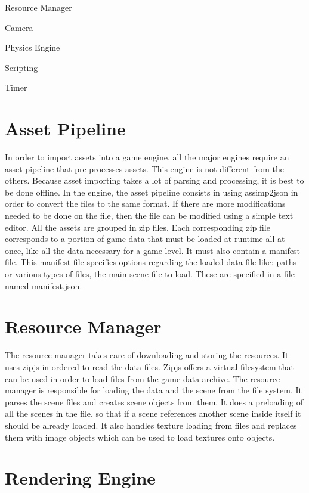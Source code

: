 \textbullet Resource Manager

\textbullet Camera

\textbullet Physics Engine

\textbullet Scripting

\textbullet Timer

\section{Asset Pipeline}

In order to import assets into a game engine, all the major engines require an asset pipeline that pre-processes assets. This engine is not different from the others. Because asset importing takes a lot of parsing and processing, it is best to be done offline. In the engine, the asset pipeline consists in using assimp2json in order to convert the files to the same format. If there are more modifications needed to be done on the file, then the file can be modified using a simple text editor. All the assets are grouped in zip files. Each corresponding zip file corresponds to a portion of game data that must be loaded at runtime all at once, like all the data necessary for a game level. It must also contain a manifest file. This manifest file specifies options regarding the loaded data file like: paths or various types of files, the main scene file to load. These are specified in a file named manifest.json.

\section{Resource Manager}

The resource manager takes care of downloading and storing the resources. It uses zipjs in ordered to read the data files. Zipjs offers a virtual filesystem that can be used in order to load files from the game data archive.
The resource manager is responsible for loading the data and the scene from the file system. It parses the scene files and creates scene objects from them. It does a preloading of all the scenes in the file, so that if a scene references another scene inside itself it should be already loaded. It also handles texture loading from files and replaces them with image objects which can be used to load textures onto objects.

\section{Rendering Engine}

